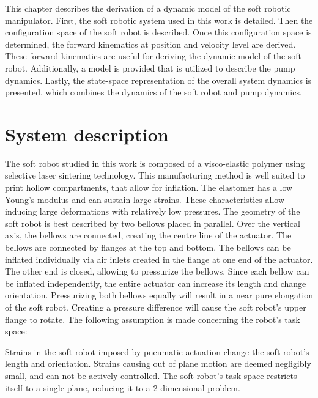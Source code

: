 \label{chap2}

This chapter describes the derivation of a dynamic model of the soft robotic manipulator. First, the soft robotic system used in this work is detailed. Then the configuration space of the soft robot is described. Once this configuration space is determined, the forward kinematics at position and velocity level are derived. These forward kinematics are useful for deriving the dynamic model of the soft robot. Additionally, a model is provided that is utilized to describe the pump dynamics. Lastly, the state-space representation of the overall system dynamics is presented, which combines the dynamics of the soft robot and pump dynamics.



\section{System description}

The soft robot studied in this work is composed of a visco-elastic polymer using selective laser sintering technology. This manufacturing method is well suited to print hollow compartments, that allow for inflation. The elastomer has a low Young's modulus and can sustain large strains. These characteristics allow inducing large deformations with relatively low pressures. The geometry of the soft robot is best described by two bellows placed in parallel. Over the vertical axis, the bellows are connected, creating the centre line of the actuator. The bellows are connected by flanges at the top and bottom. The bellows can be inflated individually via air inlets created in the flange at one end of the actuator. The other end is closed, allowing to pressurize the bellows. Since each bellow can be inflated independently, the entire actuator can increase its length and change orientation. Pressurizing both bellows equally will result in a near pure elongation of the soft robot. Creating a pressure difference will cause the soft robot's upper flange to rotate. The following assumption is made concerning the robot's task space:

\begin{theorem}
Strains in the soft robot imposed by pneumatic actuation change the soft robot's length and orientation. Strains causing out of plane motion are deemed negligibly small, and can not be actively controlled. The soft robot's task space restricts itself to a single plane, reducing it to a 2-dimensional problem.


\end{theorem}

